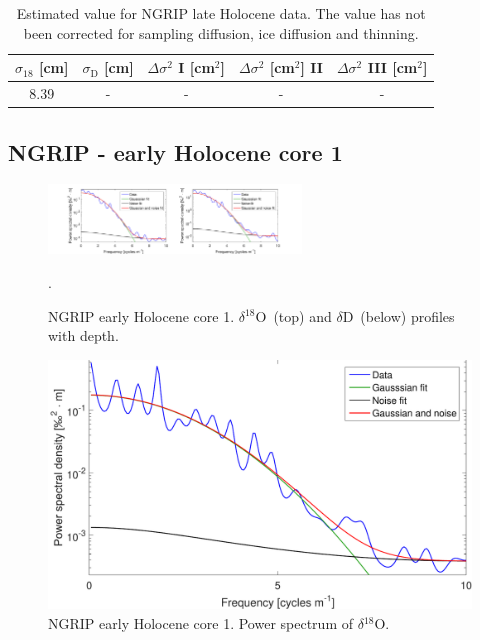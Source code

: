 \documentclass[11pt, draftcls, onecolumn]{IEEEtran} %
\numberwithin{equation}{section}
\numberwithin{table}{section}
\numberwithin{figure}{section}
\newcommand{\delOx}{$\delta{}^{18}\mathrm{O}$}
\newcommand{\delD}{$\delta\mathrm{D}$}
\begin{document}
\begin{appendices}
\begin{table}[H]
	\center
	\caption{Estimated value for NGRIP late Holocene data.
		The value has not been corrected for sampling diffusion, ice diffusion and thinning.}
	\label{NGRIP_late_holo_diff1}
	\begin{tabular}{c c c c c} 
		\toprule
		$\sigma_{18}$ [cm] & $\sigma_\mathrm{D}$ [cm] & $\Delta\sigma^2$ I [cm$^2$] & $\Delta\sigma^2$ [cm$^2$] II & $\Delta\sigma^2$ III [cm$^2$] \\
		\midrule
		8.39 &   - &    - &     - &     - \\
		\bottomrule		
	\end{tabular}
\end{table}


\clearpage
\subsection{NGRIP - early Holocene core 1}

\begin{figure}[H]
	\vspace*{2mm}
	\begin{center}
		\includegraphics[width=0.6\textwidth]{Figure_29}
		\caption{NGRIP early Holocene core 1. \delOx~(top) and \delD~(below) profiles with depth.}  \label{fig:NGRIP_early_1}.
	\end{center}
\end{figure}

\begin{figure}[H]
	\vspace*{2mm}
	\begin{center}
		\includegraphics[width=.5\textwidth]{Figure_30}
		\caption{NGRIP early Holocene core 1. Power spectrum of \delOx.}  \label{fig:NGRIP_early1}
	\end{center}
\end{figure}


\end{appendices}
\end{document}
